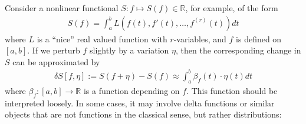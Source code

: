 \documentclass[12pt,b5paper,notitlepage]{article}
\theoremstyle{definition}
\theoremstyle{plain}
\newcommand{\Rbb}{\mathbb R}
\numberwithin{equation}{section}
\begin{document}
Consider a nonlinear functional $S:f\mapsto S(f)\in\Rbb$, for example, of the form
\begin{gather*}
S(f)=\int_a^b L(f(t),f'(t),\dots,f^{(r)}(t))dt
\end{gather*}
where $L$ is a ``nice'' real valued function with $r$-variables, and $f$ is defined on $[a,b]$. If we perturb $f$ slightly by a variation $\eta$, then the corresponding change in $S$ can be approximated by
\begin{align}\label{eq2}
\delta S[f,\eta]:=S(f+\eta)-S(f)\approx \int_a^b  \beta_f(t)\cdot \eta(t)dt
\end{align}
where $\beta_f:[a,b]\rightarrow\Rbb$ is a function depending on $f$. This function should be interpreted loosely. In some cases, it may involve delta functions or similar objects that are not functions in the classical sense, but rather distributions:
\end{document}
